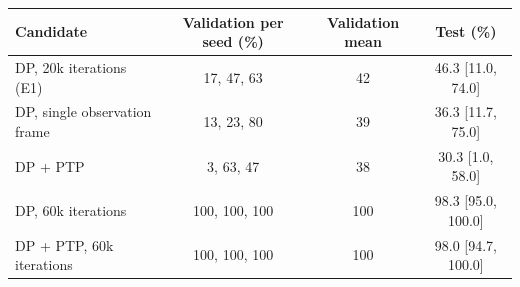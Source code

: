 \begin{tabular}{lccc}
\toprule
Candidate & Validation per seed (\%) & Validation mean & Test (\%) \\
\midrule
DP, 20k iterations (E1) & 17, 47, 63 & 42 & 46.3 [11.0, 74.0] \\
DP, single observation frame & 13, 23, 80 & 39 & 36.3 [11.7, 75.0] \\
DP + PTP & 3, 63, 47 & 38 & 30.3 [1.0, 58.0] \\
DP, 60k iterations & 100, 100, 100 & 100 & 98.3 [95.0, 100.0] \\
DP + PTP, 60k iterations & 100, 100, 100 & 100 & 98.0 [94.7, 100.0] \\
\bottomrule
\end{tabular}
